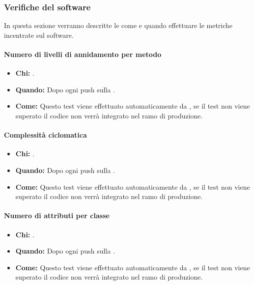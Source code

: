 \newpage
\subsubsection{Verifiche del software}
In questa sezione verranno descritte le come e quando effettuare le metriche incentrate sul software.

\paragraph{Numero di livelli di annidamento per metodo}
\begin{itemize}
\item \textbf{Chi:} .
\item \textbf{Quando:} Dopo ogni push sulla .
\item \textbf{Come:} Questo test viene effettuato automaticamente da , se il test non viene superato il codice non verrà integrato nel ramo di produzione.
\end{itemize}

\paragraph{Complessità ciclomatica}
\begin{itemize}
\item \textbf{Chi:} .
\item \textbf{Quando:} Dopo ogni push sulla .
\item \textbf{Come:} Questo test viene effettuato automaticamente da , se il test non viene superato il codice non verrà integrato nel ramo di produzione.
\end{itemize}

\paragraph{Numero di attributi per classe}
\begin{itemize}
\item \textbf{Chi:} .
\item \textbf{Quando:} Dopo ogni push sulla .
\item \textbf{Come:} Questo test viene effettuato automaticamente da , se il test non viene superato il codice non verrà integrato nel ramo di produzione.
\end{itemize}

